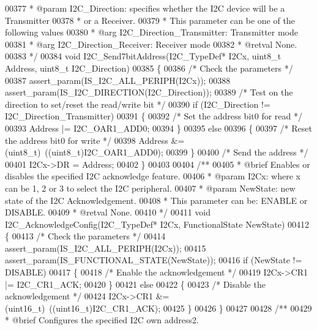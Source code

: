 \begin{DoxyCode}
00377 \textcolor{comment}{  * @param  I2C\_Direction: specifies whether the I2C device will be a Transmitter}
00378 \textcolor{comment}{  *         or a Receiver. }
00379 \textcolor{comment}{  *          This parameter can be one of the following values}
00380 \textcolor{comment}{  *            @arg I2C\_Direction\_Transmitter: Transmitter mode}
00381 \textcolor{comment}{  *            @arg I2C\_Direction\_Receiver: Receiver mode}
00382 \textcolor{comment}{  * @retval None.}
00383 \textcolor{comment}{  */}
00384 \textcolor{keywordtype}{void} I2C_Send7bitAddress(I2C\_TypeDef* I2Cx, uint8\_t Address, uint8\_t I2C\_Direction)
00385 \{
00386   \textcolor{comment}{/* Check the parameters */}
00387   assert_param(IS\_I2C\_ALL\_PERIPH(I2Cx));
00388   assert_param(IS\_I2C\_DIRECTION(I2C\_Direction));
00389   \textcolor{comment}{/* Test on the direction to set/reset the read/write bit */}
00390   \textcolor{keywordflow}{if} (I2C\_Direction != I2C_Direction_Transmitter)
00391   \{
00392     \textcolor{comment}{/* Set the address bit0 for read */}
00393     Address |= I2C_OAR1_ADD0;
00394   \}
00395   \textcolor{keywordflow}{else}
00396   \{
00397     \textcolor{comment}{/* Reset the address bit0 for write */}
00398     Address &= (uint8\_t)~((uint8\_t)I2C_OAR1_ADD0);
00399   \}
00400   \textcolor{comment}{/* Send the address */}
00401   I2Cx->DR = Address;
00402 \}
00403 
00404 \textcolor{comment}{/**}
00405 \textcolor{comment}{  * @brief  Enables or disables the specified I2C acknowledge feature.}
00406 \textcolor{comment}{  * @param  I2Cx: where x can be 1, 2 or 3 to select the I2C peripheral.}
00407 \textcolor{comment}{  * @param  NewState: new state of the I2C Acknowledgement.}
00408 \textcolor{comment}{  *          This parameter can be: ENABLE or DISABLE.}
00409 \textcolor{comment}{  * @retval None.}
00410 \textcolor{comment}{  */}
00411 \textcolor{keywordtype}{void} I2C_AcknowledgeConfig(I2C\_TypeDef* I2Cx, FunctionalState NewState)
00412 \{
00413   \textcolor{comment}{/* Check the parameters */}
00414   assert_param(IS\_I2C\_ALL\_PERIPH(I2Cx));
00415   assert_param(IS\_FUNCTIONAL\_STATE(NewState));
00416   \textcolor{keywordflow}{if} (NewState != DISABLE)
00417   \{
00418     \textcolor{comment}{/* Enable the acknowledgement */}
00419     I2Cx->CR1 |= I2C_CR1_ACK;
00420   \}
00421   \textcolor{keywordflow}{else}
00422   \{
00423     \textcolor{comment}{/* Disable the acknowledgement */}
00424     I2Cx->CR1 &= (uint16\_t)~((uint16\_t)I2C_CR1_ACK);
00425   \}
00426 \}
00427 
00428 \textcolor{comment}{/**}
00429 \textcolor{comment}{  * @brief  Configures the specified I2C own address2.}

\end{DoxyCode}
